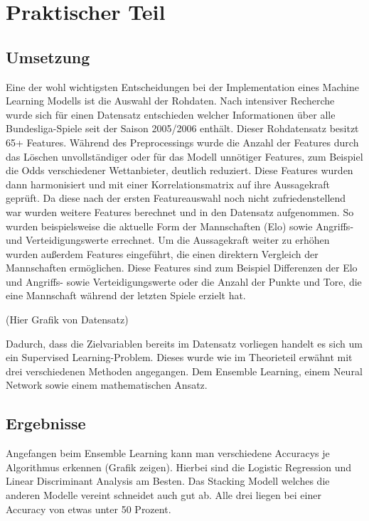 \chapter{Praktischer Teil}

\section{Umsetzung}

Eine der wohl wichtigsten Entscheidungen bei der Implementation
eines Machine Learning Modells ist die Auswahl der Rohdaten.
Nach intensiver Recherche wurde sich für einen Datensatz
entschieden welcher Informationen über alle Bundesliga-Spiele
seit der Saison 2005/2006 enthält. Dieser Rohdatensatz besitzt
65+ Features. Während des Preprocessings wurde die Anzahl der Features durch
das Löschen unvollständiger oder für das Modell unnötiger Features, zum Beispiel die
Odds verschiedener Wettanbieter, deutlich reduziert. Diese Features wurden dann
harmonisiert und mit einer Korrelationsmatrix auf ihre Aussagekraft geprüft.
Da diese nach der ersten Featureauswahl noch nicht zufriedenstellend war
wurden weitere Features berechnet und in den Datensatz aufgenommen. So wurden
beispielsweise die aktuelle Form der Mannschaften (Elo) sowie Angriffs- und
Verteidigungswerte errechnet. Um die Aussagekraft weiter zu erhöhen wurden außerdem
Features eingeführt, die einen direktern Vergleich der Mannschaften ermöglichen.
Diese Features sind zum Beispiel Differenzen der Elo und Angriffs- sowie Verteidigungswerte
oder die Anzahl der Punkte und Tore, die eine Mannschaft während der letzten Spiele erzielt hat.

(Hier Grafik von Datensatz)

Dadurch, dass die Zielvariablen bereits im Datensatz  vorliegen
handelt es sich um ein Supervised Learning-Problem. Dieses wurde
wie im Theorieteil erwähnt mit drei verschiedenen Methoden angegangen.
Dem Ensemble Learning, einem Neural Network sowie einem mathematischen Ansatz.

\section{Ergebnisse}

Angefangen beim Ensemble Learning kann man verschiedene Accuracys
je Algorithmus erkennen (Grafik zeigen). Hierbei sind die Logistic
Regression und Linear Discriminant Analysis am Besten. Das
Stacking Modell welches die anderen Modelle vereint schneidet
auch gut ab. Alle drei liegen bei einer Accuracy von etwas unter
50 Prozent.

